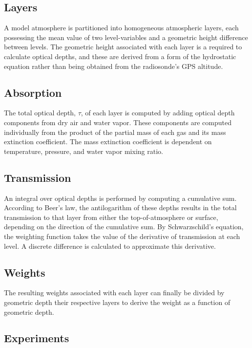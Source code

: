 \documentclass[twocol]{ametsoc}
\begin{document}
\subsection{Layers}

A model atmosphere is partitioned into homogeneous atmospheric layers, each possessing the mean value of two level-variables and a geometric height difference between levels.
The geometric height associated with each layer is a required to calculate optical depths, and these are derived from a form of the hydrostatic equation rather than being obtained from the radiosonde's GPS altitude.

\subsection{Absorption}

The total optical depth, $\tau$, of each layer is computed by adding optical depth components from dry air and water vapor.
These components are computed individually from the product of the partial mass of each gas and its mass extinction coefficient.
The mass extinction coefficient is dependent on temperature, pressure, and water vapor mixing ratio.

\subsection{Transmission}

An integral over optical depths is performed by computing a cumulative sum.
According to Beer's law, the antilogarithm of these depths results in the total transmission to that layer from either the top-of-atmosphere or surface, depending on the direction of the cumulative sum.
By Schwarzschild's equation, the weighting function takes the value of the derivative of transmission at each level.
A discrete difference is calculated to approximate this derivative.

\subsection{Weights}

The resulting weights associated with each layer can finally be divided by geometric depth their respective layers to derive the weight as a function of geometric depth.

\subsection{Experiments}
\end{document}
